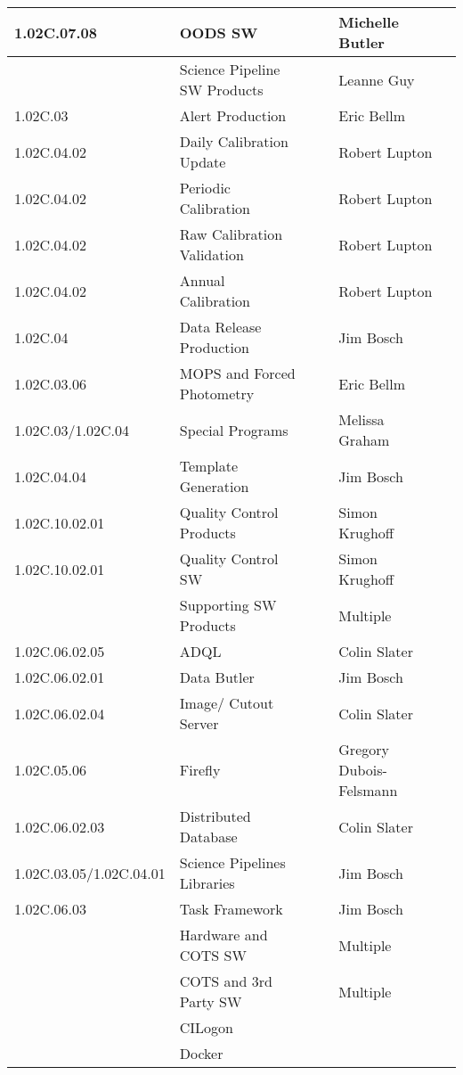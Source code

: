\begin{longtable}{|p{}|p{}|p{}|p{}|p{}|p{}|}
1.02C.07.08 &  OODS SW &  &  & Michelle Butler & \\ \hline
 &  Science Pipeline SW Products &  &  & Leanne Guy & \\ \hline
1.02C.03 &  Alert Production &  &  & Eric Bellm & \\ \hline
1.02C.04.02 &  Daily Calibration Update &  &  & Robert Lupton & \\ \hline
1.02C.04.02 &  Periodic Calibration &  &  & Robert Lupton & \\ \hline
1.02C.04.02 &  Raw Calibration Validation &  &  & Robert Lupton & \\ \hline
1.02C.04.02 &  Annual Calibration &  &  & Robert Lupton & \\ \hline
1.02C.04 &  Data Release Production &  &  & Jim Bosch & \\ \hline
1.02C.03.06 &  MOPS and Forced Photometry &  &  & Eric Bellm & \\ \hline
1.02C.03/1.02C.04 &  Special Programs &  &  & Melissa Graham & \\ \hline
1.02C.04.04 &  Template Generation &  &  & Jim Bosch & \\ \hline
1.02C.10.02.01 &  Quality Control Products &  &  & Simon Krughoff & \\ \hline
1.02C.10.02.01 &  Quality Control SW &  &  & Simon Krughoff & \\ \hline
 &  Supporting SW Products &  &  & Multiple & \\ \hline
1.02C.06.02.05 &  ADQL &  &  & Colin Slater & \\ \hline
1.02C.06.02.01 &  Data Butler &  &  & Jim Bosch & \\ \hline
1.02C.06.02.04 &  Image/ Cutout Server &  &  & Colin Slater & \\ \hline
1.02C.05.06 &  Firefly &  &  & Gregory Dubois-Felsmann & \\ \hline
1.02C.06.02.03 &  Distributed Database &  &  & Colin Slater & \\ \hline
1.02C.03.05/1.02C.04.01 &  Science Pipelines Libraries &  &  & Jim Bosch & \\ \hline
1.02C.06.03 &  Task Framework &  &  & Jim Bosch & \\ \hline
 &  Hardware and COTS SW &  &  & Multiple & \\ \hline
 &  COTS and 3rd Party SW &  &  & Multiple & \\ \hline
 &  CILogon &  &  &  & \\ \hline
 &  Docker &  &  &  & \\ \hline

\end{longtable}

